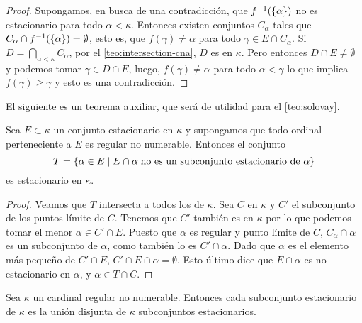 \begin{proof}
    Supongamos, en busca de una contradicción, que $f^{-1}(\left\{ \alpha \right\})$ no es estacionario
    para todo $\alpha<\kappa$. Entonces existen conjuntos \cna{} $C_\alpha$ tales que
    $C_\alpha\cap f^{-1}(\left\{ \alpha \right\}) = \emptyset$, esto es,
    que $f(\gamma)\neq\alpha$ para todo $\gamma\in E\cap C_\alpha$.
    Si $D=\dint_{\alpha<\kappa} C_\alpha$,
    por el \cref{teo:intersection-cna}, $D$ es \cna{} en $\kappa$.
    Pero entonces $D\cap E\neq\emptyset$ y podemos tomar $\gamma\in D\cap E$,
    luego, $f(\gamma)\neq\alpha$ para todo $\alpha<\gamma$
    lo que implica $f(\gamma)\geq\gamma$ y esto es una contradicción.
\end{proof}

El siguiente es un teorema auxiliar, que será de utilidad para el \cref{teo:solovay}.

\begin{teo}\label{teo:stationary}
    Sea $E\subset\kappa$ un conjunto estacionario en $\kappa$ y supongamos que todo
    ordinal perteneciente a $E$ es regular no numerable. Entonces el conjunto
    \[
        T=\left\{ \alpha\in E\mid
            E\cap\alpha\;\text{no es un subconjunto estacionario de $\alpha$} \right\}
    \]
    es estacionario en $\kappa$.
\end{teo}

\begin{proof}
    Veamos que $T$ intersecta a todos los \cna{} de $\kappa$.
    Sea $C$ \cna{} en $\kappa$ y $C'$ el subconjunto de los puntos límite de $C$.
    Tenemos que $C'$ también es \cna{} en $\kappa$ por lo que podemos tomar
    el menor $\alpha\in C'\cap E$.
    Puesto que $\alpha$ es regular y punto límite de $C$, $C_\alpha\cap\alpha$ es un subconjunto
    \cna{} de $\alpha$, como también lo es $C'\cap\alpha$. Dado que $\alpha$ es el elemento
    más pequeño de $C'\cap E$, $C'\cap E\cap\alpha = \emptyset$. Esto último
    dice que $E\cap\alpha$ es no estacionario en $\alpha$, y $\alpha\in T\cap C$.
\end{proof}

\begin{teo}[Solovay]\label{teo:solovay}
    Sea $\kappa$ un cardinal regular no numerable. Entonces cada subconjunto estacionario
    de $\kappa$ es la unión disjunta de $\kappa$ subconjuntos estacionarios.
\end{teo}


